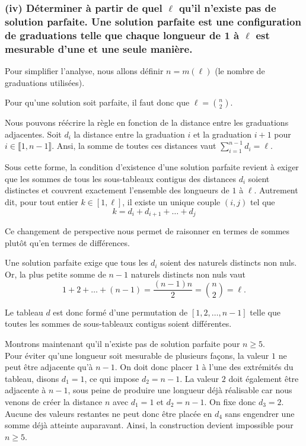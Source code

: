 \subsubsection*{(iv) Déterminer à partir de quel \( \ell \) qu'il n'existe pas de solution parfaite. Une solution parfaite est une configuration de graduations telle que chaque longueur de 1 à \( \ell \) est mesurable d'une et une seule manière.}

\vspace{1\baselineskip}

Pour simplifier l'analyse, nous allons définir $n = m(\ell)$ (le nombre de graduations utilisées).

\medskip

Pour qu'une solution soit parfaite, il faut donc que $\ell = \binom{n}{2}$.

Nous pouvons réécrire la règle en fonction de la distance entre les graduations adjacentes.  
Soit \( d_i \) la distance entre la graduation \( i \) et la graduation \( i+1 \) pour \( i \in \llbracket 1, n-1 \rrbracket \).  
Ansi, la somme de toutes ces distances vaut \( \sum_{i=1}^{n-1} d_i = \ell \).

\medskip

Sous cette forme, la condition d'existence d'une solution parfaite revient à exiger que les sommes de tous les sous-tableaux contigus des distances \( d_i \) soient distinctes et couvrent exactement l'ensemble des longueurs de \( 1 \) à \( \ell \).  
Autrement dit, pour tout entier $k \in [1, \ell]$, il existe un unique couple \( (i, j) \) tel que  
\[
    k = d_i + d_{i+1} + \ldots + d_j
\]

\medskip

Ce changement de perspective nous permet de raisonner en termes de sommes plutôt qu'en termes de différences.

\medskip

Une solution parfaite exige que tous les \( d_i \) soient des naturels distincts non nuls.  
Or, la plus petite somme de $n-1$ naturels distincts non nuls vaut  
\[
1 + 2 + \ldots + (n-1) = \frac{(n-1)n}{2} = \binom{n}{2} = \ell .
\]

\medskip

Le tableau $d$ est donc formé d'une permutation de $[1, 2, \ldots, n-1]$ telle que toutes les sommes de sous-tableaux contigus soient différentes.

\medskip

Montrons maintenant qu'il n'existe pas de solution parfaite pour \( n \geq 5 \). \\
Pour éviter qu'une longueur soit mesurable de plusieurs façons, la valeur \(1\) ne peut être adjacente qu'à \(n-1\). 
On doit donc placer \(1\) à l'une des extrémités du tableau, disons \( d_1 = 1 \), ce qui impose \( d_2 = n-1 \).  
La valeur \(2\) doit également être adjacente à \(n-1\), sous peine de produire une longueur déjà réalisable car nous venons de créer la distance $n$ avec $d_1=1$ et $d_2=n-1$.  
On fixe donc \( d_3 = 2 \).
Aucune des valeurs restantes ne peut donc être placée en \( d_4 \) sans engendrer une somme déjà atteinte auparavant.  
Ainsi, la construction devient impossible pour \( n \geq 5 \).

